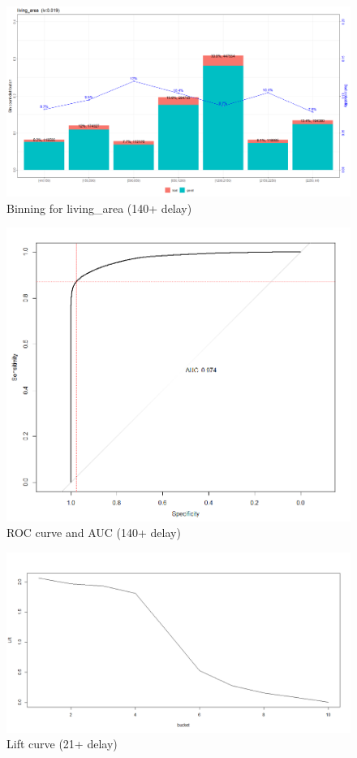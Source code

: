 \documentclass[
]{article}
\begin{document}
\begin{figure}
\centering
\includegraphics{.//WOE140.png}
\caption{\label{fig:woe140} Binning for living\_area (140+ delay)}
\end{figure}

\begin{figure}
\centering
\includegraphics{.//AUC140.png}
\caption{\label{fig:auc140} ROC curve and AUC (140+ delay)}
\end{figure}

\begin{figure}
\centering
\includegraphics{.//lift21.png}
\caption{\label{fig:lift21} Lift curve (21+ delay)}
\end{figure}
\end{document}

